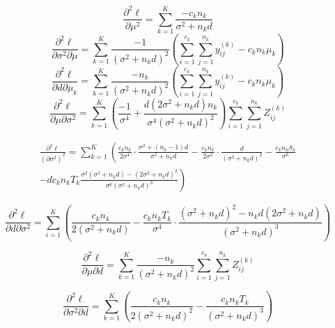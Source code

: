 \documentclass[11pt,a5paper,twoside]{book}
\begin{document}
{\begin{equation}
\frac{\partial^2\ell}{\partial \mu^2}  = \sum_{k=1}^K\frac{-c_kn_k}{\sigma^2+n_kd} \label{jhessian1}
\end{equation}
\begin{equation}
\frac{\partial^2\ell}{\partial \sigma^2 \partial \mu}  = \sum_{k=1}^K \frac{-1}{(\sigma^2+n_kd)^2} \left( \sum_{i=1}^{c_k} \sum_{j=1}^{n_k} y_{ij}^{(k)}-c_k n_k \mu_k\right) \label{jhessian2}
\end{equation}
\begin{equation}
\frac{\partial^2\ell}{\partial d \partial \mu_k}  = \sum_{k=1}^K\frac{-n_k}{(\sigma^2+n_kd)^2} \left( \sum_{i=1}^{c_k} \sum_{j=1}^{n_k} y_{ij}^{(k)}-c_k n_k \mu_k\right) \label{jhessian3}
\end{equation}
\begin{equation}
\frac{\partial^2\ell}{\partial \mu \partial \sigma^2} = \sum_{k=1}^K \left(\frac{-1}{\sigma^4} + \frac{d(2\sigma^2+n_kd)n_k}{\sigma^4(\sigma^2+n_kd)^2} \right) \sum_{i=1}^{c_k}\sum_{j=1}^{n_k}Z_{ij}^{(k)} \label{jhessian4} 
\end{equation}

\begin{multline}
\frac{\partial^2\ell}{(\partial \sigma^2)^2} = \sum_{k=1}^K\left( \frac{c_kn_k}{2\sigma^4} \cdot \frac{\sigma^2+(n_k-1)d}{\sigma^2+n_kd}- \frac{c_kn_k}{2\sigma^2} \cdot \frac{d}{(\sigma^2+n_kd)^2} - \frac{c_kn_k S_k}{\sigma^6} \right. \\
 \left.- d c_kn_kT_k \frac{\sigma^2(\sigma^2+n_kd)-(2\sigma^2+n_kd)^2}{\sigma^6(\sigma^2+n_kd)^3}\right) \label{jhessian5}
\end{multline}

\begin{equation}
\frac{\partial^2\ell}{\partial d \partial \sigma^2} = \sum_{i=1}^K\left( \frac{c_kn_k}{2(\sigma^2+n_kd)}- \frac{c_kn_k T_k}{\sigma^4} \cdot \frac{(\sigma^2+n_kd)^2 - n_k d (2\sigma^2+n_kd)}{(\sigma^2+n_kd)^3} \right)\label{jhessian6}
\end{equation}

\begin{equation}
\frac{\partial^2\ell}{\partial \mu \partial d} =\sum_{k=1}^K \frac{-n_k}{(\sigma^2+n_kd)^2}\sum_{i=1}^{c_k} \sum_{j=1}^{n_k} Z_{ij}^{(k)} \label{jhessian7}
\end{equation}

\begin{equation}
\frac{\partial^2\ell}{\partial \sigma^2 \partial d} = \sum_{k=1}^K\left( \frac{c_kn_k}{2(\sigma^2+n_kd)^2}-\frac{c_kn_kT_k}{(\sigma^2+n_kd)^3} \right) \label{jhessian8}
\end{equation}

}
\end{document}
